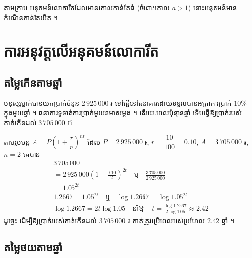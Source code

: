 \begin{formulaBox}[ជាទូទៅ]
តាមក្រាប អនុគមន៍លោការីតដែលមានគោលកាន់តែធំ (ចំពោះគោល $a > 1$) នោះអនុគមន៍មានកំណើនកាន់តែយឺត ។
\end{formulaBox}

\section{ការអនុវត្តលើអនុគមន៍លោការីត}

\subsection{តម្លៃកើនតាមឆ្នាំ}

\begin{example}[ឧទាហរណ៍]
មនុស្សម្នាក់បានយកប្រាក់ចំនួន $2\,925\,000$ ៛ ទៅផ្ញើនៅធនាគារដោយទទួលបានអត្រាការប្រាក់ $10\%$ ក្នុងមួយឆ្នាំ ។ ធនាគារទូទាត់ការប្រាក់មួយឆមាសម្តង ។ តើរយៈពេលប៉ុន្មានឆ្នាំ ទើបធ្វើឱ្យប្រាក់របស់គាត់កើនដល់ $3\,705\,000$ ៛?

តាមរូបមន្ត $A = P\left(1 + \dfrac{r}{n}\right)^{nt}$ ដែល $P = 2\,925\,000$ ៛, $r = \dfrac{10}{100} = 0.10$, $A = 3\,705\,000$ ៛, $n = 2$ គេបាន
\[
\begin{aligned}
&3\,705\,000\\
&= 2\,925\,000\left(1 + \frac{0.10}{2}\right)^{2t} \quad \text{ឬ} \quad \frac{3\,705\,000}{2\,925\,000}\\
&= 1.05^{2t}\\
&1.2667 = 1.05^{2t} \quad \text{ឬ} \quad \log 1.2667 = \log 1.05^{2t}\\
&\log 1.2667 = 2t\log 1.05 \quad \text{នាំឱ្យ} \quad t = \frac{\log 1.2667}{2\log 1.05} \approx 2.42
\end{aligned}
\]
ដូច្នេះ ដើម្បីឱ្យប្រាក់របស់គាត់កើនដល់ $3\,705\,000$ ៛ គាត់ត្រូវប្រើពេលអស់ប្រហែល $2.42$ ឆ្នាំ ។
\end{example}

\subsection{តម្លៃថយតាមឆ្នាំ}


